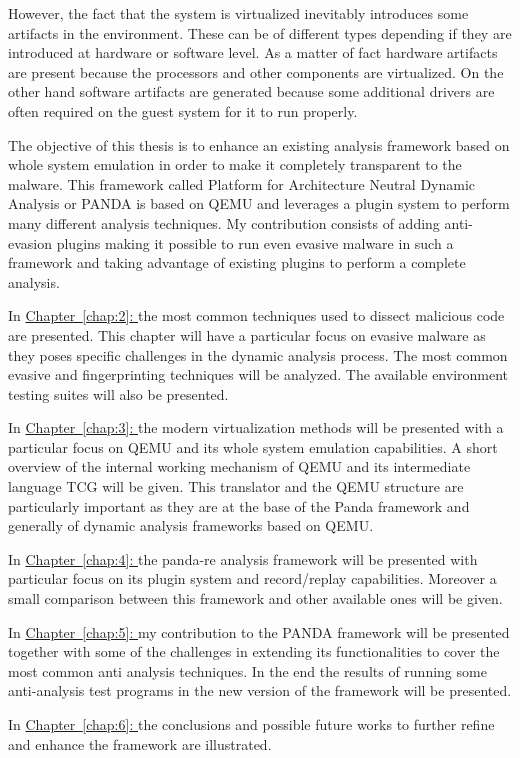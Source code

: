However, the fact that the system is virtualized inevitably introduces some artifacts in the environment. These can be of different types depending if they are introduced at hardware or software level. As a matter of fact hardware artifacts are present because the processors and other components are virtualized. On the other hand software artifacts are generated because some additional drivers are often required on the guest system for it to run properly. 

The objective of this thesis is to enhance an existing analysis framework based on whole system emulation in order to make it completely transparent to the malware. This framework called Platform for Architecture Neutral Dynamic Analysis or PANDA is based on QEMU and leverages a plugin system to perform many different analysis techniques. My contribution consists of adding anti-evasion plugins making it possible to run even evasive malware in such a framework and taking advantage of existing plugins to perform a complete analysis.


\bigskip
In \hyperref[chap:2]{Chapter~\ref*{chap:2}: } the most common techniques used to dissect malicious code are presented. This chapter will have a particular focus on evasive malware as they poses specific challenges in the dynamic analysis process. The most common evasive and fingerprinting techniques will be analyzed. The available environment testing suites will also be presented. 


\bigskip
In \hyperref[chap:3]{Chapter~\ref*{chap:3}: } the modern virtualization methods will be presented with a particular focus on QEMU and its whole system emulation capabilities. A short overview of the internal working mechanism of QEMU and its intermediate language TCG will be given. This translator and the QEMU structure are particularly important as they are at the base of the Panda framework and generally of dynamic analysis frameworks based on QEMU.


\bigskip
In \hyperref[chap:4]{Chapter~\ref*{chap:4}: } the panda-re analysis framework will be presented with particular focus on its plugin system and record/replay capabilities. Moreover a small comparison between this framework and other available ones will be given. 


\bigskip
In \hyperref[chap:5]{Chapter~\ref*{chap:5}: }  my contribution to the PANDA framework will be presented together with some of the challenges in extending its functionalities to cover the most common anti analysis techniques. In the end the results of running some anti-analysis test programs in the new version of the framework will be presented.


\bigskip
In \hyperref[chap:6]{Chapter~\ref*{chap:6}: } the conclusions and possible future works to further refine and enhance the framework are illustrated.